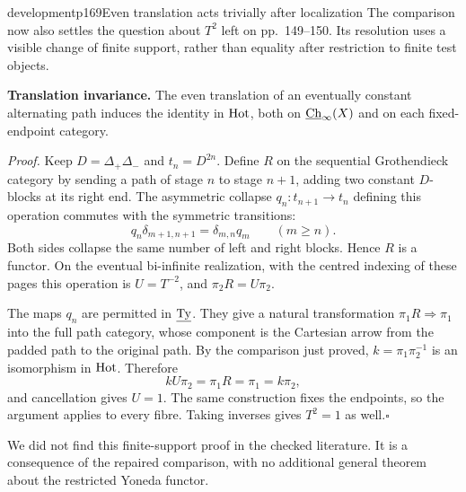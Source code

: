 \begin{dcomment}{development}{p169}{Even translation acts trivially after localization}
The comparison now also settles the question about $T^2$ left on pp.~149--150. Its resolution uses a visible change of finite support, rather than equality after restriction to finite test objects.

\textbf{Translation invariance.}\ours\quad
The even translation of an eventually constant alternating path induces the identity in $\mathrm{Hot}$, both on $\underline{\mathrm{Ch}}_\infty(X)$ and on each fixed-endpoint category.

\emph{Proof.} Keep $D=\Delta_+\Delta_-$ and $t_n=D^{2n}$. Define $R$ on the sequential Grothendieck category by sending a path of stage $n$ to stage $n+1$, adding two constant $D$-blocks at its right end. The asymmetric collapse $q_n:t_{n+1}\to t_n$ defining this operation commutes with the symmetric transitions:
\[
 q_n\delta_{m+1,n+1}=\delta_{m,n}q_m\qquad(m\geq n).
\]
Both sides collapse the same number of left and right blocks. Hence $R$ is a functor. On the eventual bi-infinite realization, with the centred indexing of these pages this operation is $U=T^{-2}$, and $\pi_2R=U\pi_2$.

The maps $q_n$ are permitted in $\underline{\mathrm{Ty}}$. They give a natural transformation $\pi_1R\Rightarrow\pi_1$ into the full path category, whose component is the Cartesian arrow from the padded path to the original path. By the comparison just proved, $k=\pi_1\pi_2^{-1}$ is an isomorphism in $\mathrm{Hot}$. Therefore
\[
 kU\pi_2=\pi_1R=\pi_1=k\pi_2,
\]
and cancellation gives $U=1$. The same construction fixes the endpoints, so the argument applies to every fibre. Taking inverses gives $T^2=1$ as well.\hfill$\square$

We did not find this finite-support proof in the checked literature. It is a consequence of the repaired comparison, with no additional general theorem about the restricted Yoneda functor.
\end{dcomment}


